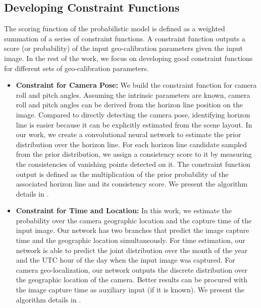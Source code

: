\subsection{Developing Constraint Functions}
The scoring function of the probabilistic
model is defined as a weighted summation of a series of constraint
functions.
A constraint function outputs a score (or probability) of the input
geo-calibration parameters given the input image. In the rest of the
work, we focus on developing good constraint functions for different
sets of geo-calibration parameters. 

\begin{itemize}[noitemsep]
  \item \textbf{Constraint for Camera Pose:}
  We build the constraint function for camera roll and pitch angles.
  Assuming the intrinsic parameters are known, camera roll and pitch
  angles can be derived from the horizon line position on the image.
  Compared to directly detecting the camera pose, identifying horizon
  line is easier because it can be explicitly estimated from the scene
  layout.
  In our work, we create a convolutional neural network to estimate the
  prior distribution over the horizon line.
  For each horizon line candidate sampled from the prior distribution,
  we assign a consistency score to it by measuring the consistencies of
  vanishing points detected on it.
  The constraint function output is defined as the multiplication of
  the prior probability of the associated horizon line and its
  consistency score.
  We present the algorithm details in .
  \newline

  \item \textbf{Constraint for Time and Location:}
  In this work, we estimate the probability over 
  the camera geographic location and the capture time of the input
  image.
  Our network has two branches that predict the image
  capture time and the geographic location simultaneously.
  For time estimation, our network is able to predict the
  joint distribution over the month of the year and the UTC hour of the
  day when the input image was captured.
  For camera geo-localization, our network outputs the discrete
  distribution over the geographic location of the camera. Better
  results can be procured with the image capture time as auxiliary input
  (if it is known).  
  We present the algorithm details in .
  \newline


\end{itemize}
